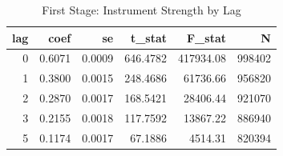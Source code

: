 \begin{table}[!h]
\centering
\caption{\label{tab:tab:iv_fs_lags}First Stage: Instrument Strength by Lag}
\centering
\begin{tabular}[t]{rrrrrr}
\toprule
lag & coef & se & t\_stat & F\_stat & N\\
\midrule
0 & 0.6071 & 0.0009 & 646.4782 & 417934.08 & 998402\\
1 & 0.3800 & 0.0015 & 248.4686 & 61736.66 & 956820\\
2 & 0.2870 & 0.0017 & 168.5421 & 28406.44 & 921070\\
3 & 0.2155 & 0.0018 & 117.7592 & 13867.22 & 886940\\
5 & 0.1174 & 0.0017 & 67.1886 & 4514.31 & 820394\\
\bottomrule
\end{tabular}
\end{table}
